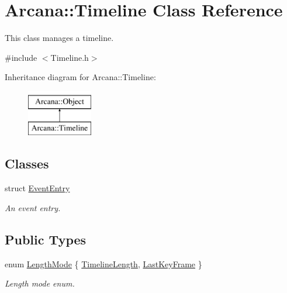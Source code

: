 \hypertarget{class_arcana_1_1_timeline}{}\section{Arcana\+:\+:Timeline Class Reference}
\label{class_arcana_1_1_timeline}


This class manages a timeline.  




{\ttfamily \#include $<$Timeline.\+h$>$}

Inheritance diagram for Arcana\+:\+:Timeline\+:\begin{figure}[H]
\begin{center}
\leavevmode
\includegraphics[height=2.000000cm]{class_arcana_1_1_timeline}
\end{center}
\end{figure}
\subsection*{Classes}
\begin{DoxyCompactItemize}
\item 
struct \mbox{\hyperlink{struct_arcana_1_1_timeline_1_1_event_entry}{Event\+Entry}}
\begin{DoxyCompactList}\small\item\em An event entry. \end{DoxyCompactList}\end{DoxyCompactItemize}
\subsection*{Public Types}
\begin{DoxyCompactItemize}
\item 
enum \mbox{\hyperlink{class_arcana_1_1_timeline_ab4605d34e12005cf268ca146751f1eed}{Length\+Mode}} \{ \mbox{\hyperlink{class_arcana_1_1_timeline_ab4605d34e12005cf268ca146751f1eeda392c0af54c9f73e38d8e676605464110}{Timeline\+Length}}, 
\mbox{\hyperlink{class_arcana_1_1_timeline_ab4605d34e12005cf268ca146751f1eedaad8bacad8edb62e39b9972fac10f2cba}{Last\+Key\+Frame}}
 \}
\begin{DoxyCompactList}\small\item\em Length mode enum. \end{DoxyCompactList}\end{DoxyCompactItemize}
